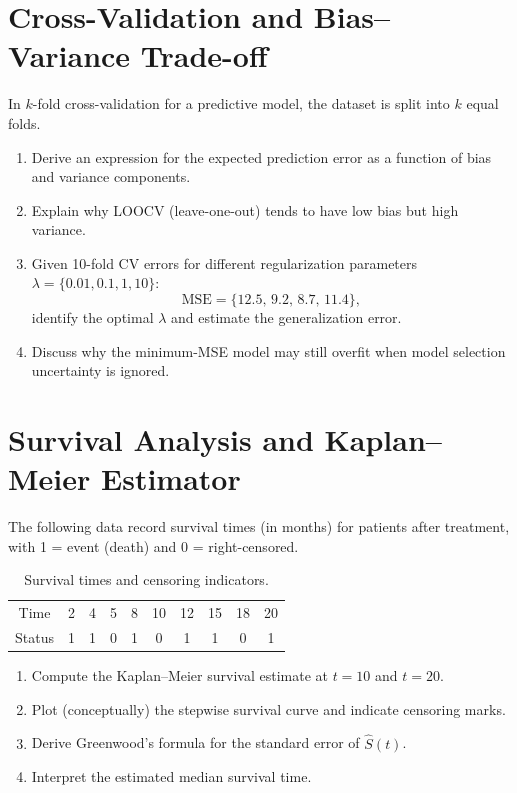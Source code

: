 \documentclass[12pt,a4paper]{article}
\begin{document}
\section{Cross-Validation and Bias–Variance Trade-off}
In \( k \)-fold cross-validation for a predictive model, the dataset is split into \( k \) equal folds.
\begin{enumerate}[label=(\arabic*)]
\item Derive an expression for the expected prediction error as a function of bias and variance components.
\item Explain why LOOCV (leave-one-out) tends to have low bias but high variance.
\item Given 10-fold CV errors for different regularization parameters \( \lambda = \{0.01, 0.1, 1, 10\} \):
\[
\mathrm{MSE} = \{12.5,\,9.2,\,8.7,\,11.4\},
\]
identify the optimal \( \lambda \) and estimate the generalization error.
\item Discuss why the minimum-MSE model may still overfit when model selection uncertainty is ignored.
\end{enumerate}


\section{Survival Analysis and Kaplan–Meier Estimator}
The following data record survival times (in months) for patients after treatment,
with 1 = event (death) and 0 = right-censored.

\begin{table}[H]
\centering
\begin{tabular}{c c c c c c c c c c}
\toprule
Time & 2 & 4 & 5 & 8 & 10 & 12 & 15 & 18 & 20 \\
Status & 1 & 1 & 0 & 1 & 0 & 1 & 1 & 0 & 1 \\
\bottomrule
\end{tabular}
\caption{Survival times and censoring indicators.}
\end{table}

\begin{enumerate}[label=(\arabic*)]
\item Compute the Kaplan–Meier survival estimate at \( t = 10 \) and \( t = 20 \).
\item Plot (conceptually) the stepwise survival curve and indicate censoring marks.
\item Derive Greenwood’s formula for the standard error of \( \hat{S}(t) \).
\item Interpret the estimated median survival time.
\end{enumerate}
\end{document}
